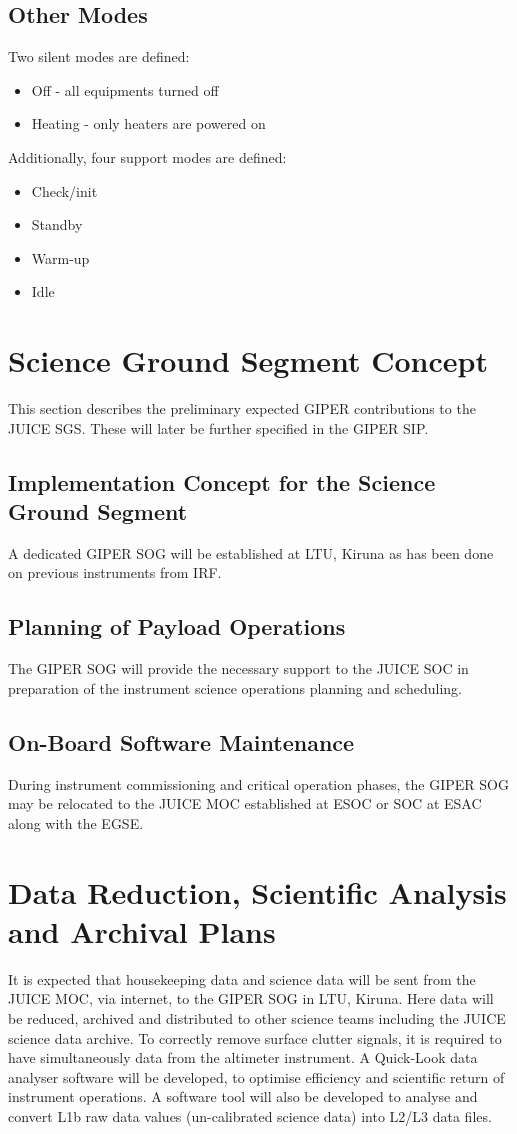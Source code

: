\subsection{Other Modes}
%
Two silent modes are defined:
\begin{itemize}
\item Off - all equipments turned off
\item Heating - only heaters are powered on
\end{itemize}
%
Additionally, four support modes are defined: 
\begin{itemize}
\item Check/init
\item Standby
\item Warm-up
\item Idle
\end{itemize}
%
%
\section{Science Ground Segment Concept}
This section describes the preliminary expected GIPER contributions to the JUICE \ac{SGS}. These will later be further specified in the \ac{GIPER} \ac{SIP}.
%
\subsection{Implementation Concept for the Science Ground Segment}
A dedicated \ac{GIPER} \ac{SOG} will be established at LTU, Kiruna as has been done on previous instruments from \ac{IRF}\cite{ASPERA_PO}. %
%
\subsection{Planning of Payload Operations}
The \ac{GIPER} \ac{SOG} will provide the necessary support to the JUICE \ac{SOC} in preparation of the instrument science operations planning and scheduling.
%
\subsection{On-Board Software Maintenance}
During instrument commissioning and critical operation phases, the \ac{GIPER} \ac{SOG} may be relocated to the JUICE \ac{MOC} established at ESOC or \ac{SOC} at ESAC along with the \ac{EGSE}. 
%
%
\section{Data Reduction, Scientific Analysis and Archival Plans}
%
It is expected that housekeeping data and science data will be sent from the JUICE \ac{MOC}, via internet, to the \ac{GIPER} \ac{SOG} in LTU, Kiruna. Here data will be reduced, archived and distributed to other science teams including the JUICE science data archive. To correctly remove surface clutter signals, it is required to have simultaneously data from the altimeter instrument. 
%
A Quick-Look data analyser software will be developed, to optimise efficiency and scientific return of instrument operations.
%
A software tool will also be developed to analyse and convert L1b raw data values (un-calibrated science data) into L2/L3 data files.
%
